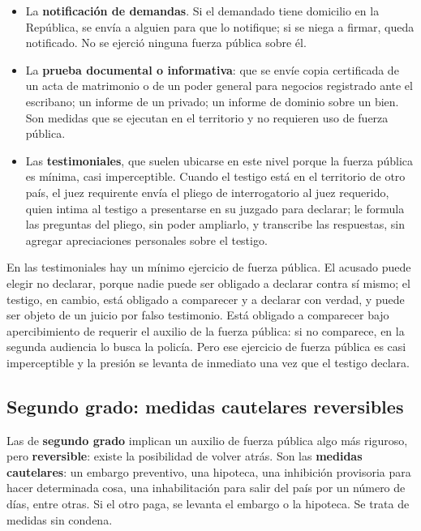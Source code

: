 \documentclass[12pt,oneside]{book}
\begin{document}
\begin{itemize}
    \item La \textbf{notificación de demandas}. Si el demandado tiene domicilio en la República, se envía a alguien para que lo notifique; si se niega a firmar, queda notificado. No se ejerció ninguna fuerza pública sobre él.
    \item La \textbf{prueba documental o informativa}: que se envíe copia certificada de un acta de matrimonio o de un poder general para negocios registrado ante el escribano; un informe de un privado; un informe de dominio sobre un bien. Son medidas que se ejecutan en el territorio y no requieren uso de fuerza pública.
    \item Las \textbf{testimoniales}, que suelen ubicarse en este nivel porque la fuerza pública es mínima, casi imperceptible. Cuando el testigo está en el territorio de otro país, el juez requirente envía el pliego de interrogatorio al juez requerido, quien intima al testigo a presentarse en su juzgado para declarar; le formula las preguntas del pliego, sin poder ampliarlo, y transcribe las respuestas, sin agregar apreciaciones personales sobre el testigo.
\end{itemize}

En las testimoniales hay un mínimo ejercicio de fuerza pública. El acusado puede elegir no declarar, porque nadie puede ser obligado a declarar contra sí mismo; el testigo, en cambio, está obligado a comparecer y a declarar con verdad, y puede ser objeto de un juicio por falso testimonio. Está obligado a comparecer bajo apercibimiento de requerir el auxilio de la fuerza pública: si no comparece, en la segunda audiencia lo busca la policía. Pero ese ejercicio de fuerza pública es casi imperceptible y la presión se levanta de inmediato una vez que el testigo declara.

\subsection{Segundo grado: medidas cautelares reversibles}

Las de \textbf{segundo grado} implican un auxilio de fuerza pública algo más riguroso, pero \textbf{reversible}: existe la posibilidad de volver atrás. Son las \textbf{medidas cautelares}: un embargo preventivo, una hipoteca, una inhibición provisoria para hacer determinada cosa, una inhabilitación para salir del país por un número de días, entre otras. Si el otro paga, se levanta el embargo o la hipoteca. Se trata de medidas sin condena.
\end{document}
